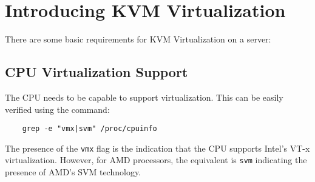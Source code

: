 
\usepackage{minted}
\usepackage{booktabs}


	
	\section{Introducing KVM Virtualization}
	There are some basic requirements for KVM Virtualization on a server: 
	
	\subsection{CPU Virtualization Support}
	The CPU needs to be capable to support virtualization. This can be easily verified using the command:
	
	\vspace{-15pt}
	\begin{verbatim}
	grep -e "vmx|svm" /proc/cpuinfo
	\end{verbatim}
	\vspace{-10pt}
	
	The presence of the \verb|vmx| flag is the indication that the CPU supports Intel's VT-x virtualization. However, for AMD processors, the equivalent is \verb|svm| indicating the presence of AMD's SVM technology. 
		
